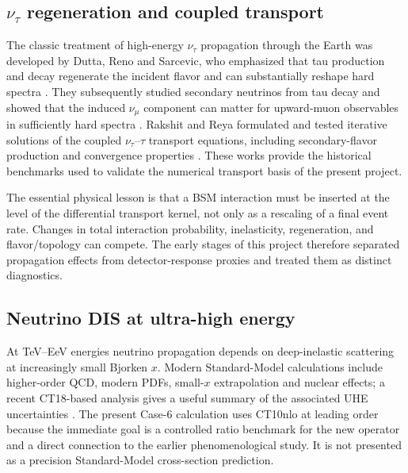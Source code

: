 \documentclass[11pt,a4paper]{article}
\begin{document}
\subsection{$\nu_\tau$ regeneration and coupled transport}
The classic treatment of high-energy $\nu_\tau$ propagation through the Earth
was developed by Dutta, Reno and Sarcevic, who emphasized that tau production
and decay regenerate the incident flavor and can substantially reshape hard
spectra \cite{Dutta:2000}.  They subsequently studied secondary neutrinos from
tau decay and showed that the induced $\nu_\mu$ component can matter for
upward-muon observables in sufficiently hard spectra \cite{Dutta:2002}.
Rakshit and Reya formulated and tested iterative solutions of the coupled
$\nu_\tau$--$\tau$ transport equations, including secondary-flavor production
and convergence properties \cite{Rakshit:2006}.  These works provide the
historical benchmarks used to validate the numerical transport basis of the
present project.

The essential physical lesson is that a BSM interaction must be inserted at
the level of the differential transport kernel, not only as a rescaling of a
final event rate.  Changes in total interaction probability, inelasticity,
regeneration, and flavor/topology can compete.  The early stages of this
project therefore separated propagation effects from detector-response
proxies and treated them as distinct diagnostics.

\subsection{Neutrino DIS at ultra-high energy}
At TeV--EeV energies neutrino propagation depends on deep-inelastic scattering
at increasingly small Bjorken $x$.  Modern Standard-Model calculations include
higher-order QCD, modern PDFs, small-$x$ extrapolation and nuclear effects; a
recent CT18-based analysis gives a useful summary of the associated UHE
uncertainties \cite{Xie:2024}.  The present Case-6 calculation uses CT10nlo at
leading order because the immediate goal is a controlled ratio benchmark for
the new operator and a direct connection to the earlier phenomenological
study.  It is not presented as a precision Standard-Model cross-section
prediction.
\end{document}
